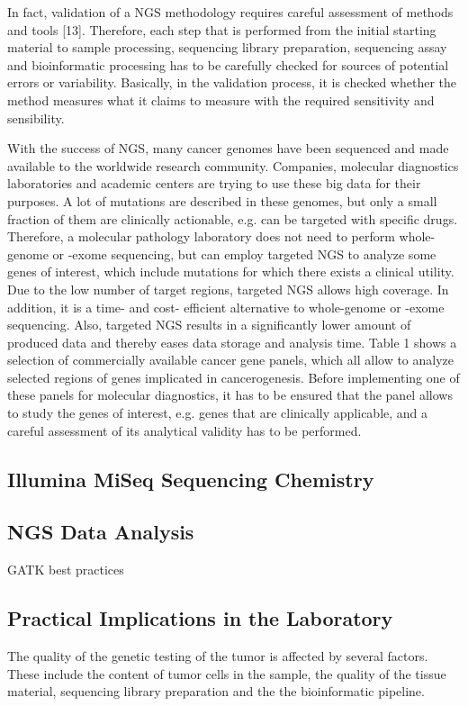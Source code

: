 In fact, validation of a NGS methodology requires careful assessment of methods
and tools [13]. Therefore, each step that is performed from the initial starting
material to sample processing, sequencing library preparation, sequencing assay
and bioinformatic processing has to be carefully checked for sources of
potential errors or variability. Basically, in the validation process, it is
checked whether the method measures what it claims to measure with the required
sensitivity and sensibility.

With the success of NGS, many cancer genomes have been sequenced and made
available to the worldwide research community. Companies, molecular diagnostics
laboratories and academic centers are trying to use these big data for their
purposes. A lot of mutations are described in these genomes, but only a small
fraction of them are clinically actionable, e.g. can be targeted with specific
drugs. Therefore, a molecular pathology laboratory does not need to perform
whole-genome or -exome sequencing, but can employ targeted NGS to analyze some
genes of interest, which include mutations for which there exists a clinical
utility. Due to the low number of target regions, targeted NGS allows high
coverage. In addition, it is a time- and cost- efficient alternative to
whole-genome or -exome sequencing. Also, targeted NGS results in a significantly
lower amount of produced data and thereby eases data storage and analysis time.
Table 1 shows a selection of commercially available cancer gene panels, which
all allow to analyze selected regions of genes implicated in cancerogenesis.
Before implementing one of these panels for molecular diagnostics, it has to be
ensured that the panel allows to study the genes of interest, e.g. genes that
are clinically applicable, and a careful assessment of its analytical validity
has to be performed.

\subsection{Illumina MiSeq Sequencing Chemistry}
\subsection{NGS Data Analysis}

GATK best practices

\subsection{Practical Implications in the Laboratory}
The quality of the genetic testing of the tumor is affected by several
factors. These include the content of tumor cells in the sample, the quality
of the tissue material, sequencing library preparation and the the
bioinformatic pipeline.

